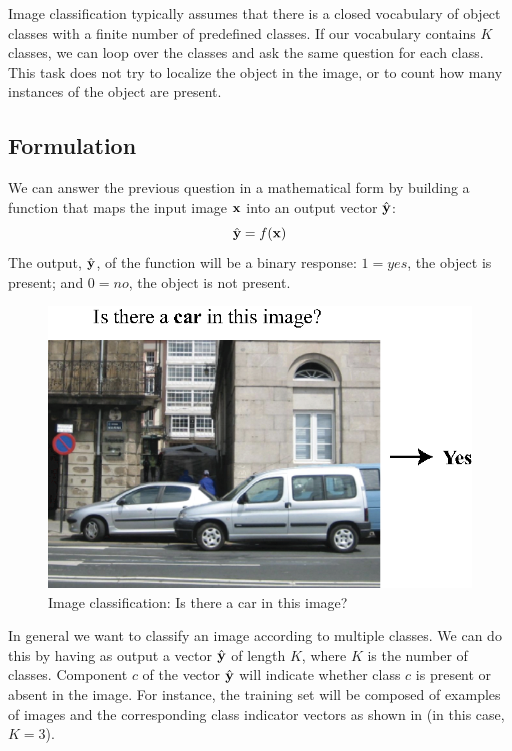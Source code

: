 Image classification typically assumes that there is a closed vocabulary of object classes with a finite number of predefined classes. If our vocabulary contains $K$ classes, we can loop over the classes and ask the same question for each class. This task does not try to localize the object in the image, or to count how many instances of the object are present.
 
\subsection{Formulation}
We can answer the previous question in a mathematical form by building a function that maps the input image ${\bf x}$ into an output vector $\hat {\bf y}$:
\begin{equation}
\hat {\bf y} = f({\bf x})
\end{equation}
The output, $\hat {\bf y}$, of the function will be a binary response: $1=yes$, the object is present; and $0=no$, the object is not present. 

\begin{figure}
\centerline{
\includegraphics[width=0.5\linewidth]{figures/object_recognition/image_classification.eps}}
\caption{Image classification: Is there a car in this image?}
\end{figure}


In general we want to classify an image according to multiple classes. We can do this by having as output a vector $\hat {\bf y}$ of length $K$, where $K$ is the number of classes. Component $c$ of the vector $\hat {\bf y}$ will indicate whether class $c$ is present or absent in the image. For instance, the training set will be composed of examples of images and the corresponding class indicator vectors as shown in \fig{\ref{fig:classification_training_set}} (in this case, $K=3$).

